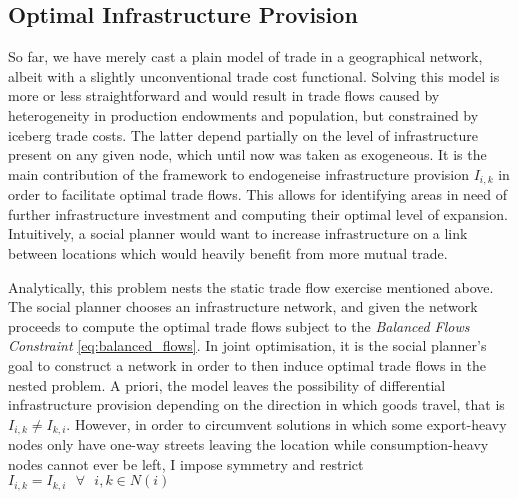 \documentclass[11pt, oneside]{article}   	%
\begin{document}
\subsection{Optimal Infrastructure Provision}
So far, we have merely cast a plain model of trade in a geographical network, albeit with a slightly unconventional trade cost functional. Solving this model is more or less straightforward and would result in trade flows caused by heterogeneity in production endowments and population, but constrained by iceberg trade costs. The latter depend partially on the level of infrastructure present on any given node, which until now was taken as exogeneous. It is the main contribution of the \cite{fajgelbaum_optimal_2017} framework to endogeneise infrastructure provision $I_{i,k}$ in order to facilitate optimal trade flows. This allows for identifying areas in need of further infrastructure investment and computing their optimal level of expansion. Intuitively, a social planner would want to increase infrastructure on a link between locations which would heavily benefit from more mutual trade.

Analytically, this problem nests the static trade flow exercise mentioned above. The social planner chooses an infrastructure network, and given the network proceeds to compute the optimal trade flows subject to the \emph{Balanced Flows Constraint} \eqref{eq:balanced_flows}. In joint optimisation, it is the social planner's goal to construct a network in order to then induce optimal trade flows in the nested problem. A priori, the model leaves the possibility of differential infrastructure provision depending on the direction in which goods travel, that is $I_{i,k} \neq I_{k,i}$. However, in order to circumvent solutions in which some export-heavy nodes only have one-way streets leaving the location while consumption-heavy nodes cannot ever be left, I impose symmetry and restrict $I_{i,k} = I_{k,i} \textrm{ } \forall \textrm{ } i,k\in N(i)$
\end{document}
